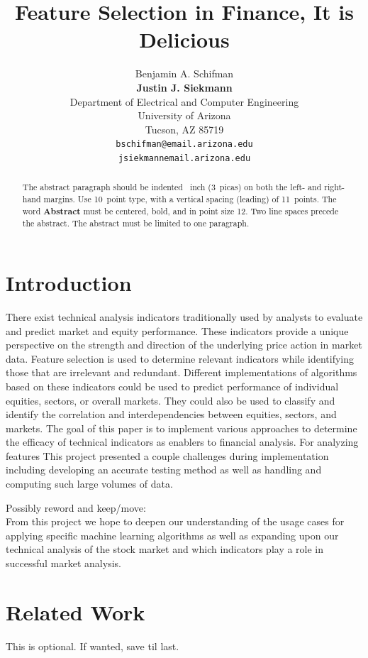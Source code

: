\documentclass{article}
\title{Feature Selection in Finance, It is Delicious}
\author{
  Benjamin A. Schifman\\
  \textbf{Justin J. Siekmann}\\
  Department of Electrical and Computer Engineering\\
  University of Arizona\\
  Tucson, AZ 85719 \\
  \texttt{bschifman@email.arizona.edu} \\
  \texttt{jsiekmannemail.arizona.edu}
}
\begin{document}
 

\maketitle

\begin{abstract}
	\color{red}
  The abstract paragraph should be indented ~inch
  (3~picas) on both the left- and right-hand margins. Use 10~point
  type, with a vertical spacing (leading) of 11~points.  The word
  \textbf{Abstract} must be centered, bold, and in point size 12. Two
  line spaces precede the abstract. The abstract must be limited to
  one paragraph.
\end{abstract}

\section{\color{red}Introduction}
There exist technical analysis indicators traditionally used by analysts to evaluate and predict market and equity performance. These indicators provide a unique perspective on the strength and direction of the underlying price action in market data. Feature selection is used to determine relevant indicators while identifying those that are irrelevant and redundant. Different implementations of algorithms based on these indicators could be used to predict performance of individual equities, sectors, or overall markets. They could also be used to classify and identify the correlation and interdependencies between equities, sectors, and markets. The goal of this paper is to implement various approaches to determine the efficacy of technical indicators as enablers to financial analysis. For analyzing features This project presented a couple challenges during implementation including developing an accurate testing method as well as handling and computing such large volumes of data.

Possibly reword and keep/move:\\
From this project we hope to deepen our understanding of the usage cases for applying specific machine learning algorithms as well as expanding upon our technical analysis of the stock market and which indicators play a role in successful market analysis.

\section{Related Work}
This is optional. If wanted, save til last.
\end{document}
